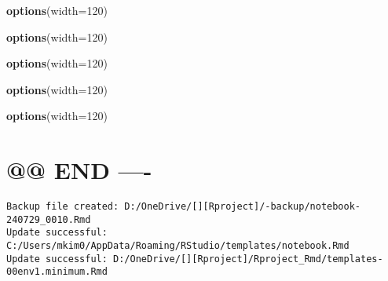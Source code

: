 \documentclass[
]{article}
\newenvironment{Shaded}{\begin{snugshade}}{\end{snugshade}}
\newcommand{\AttributeTok}[1]{\textcolor[rgb]{0.13,0.29,0.53}{#1}}
\newcommand{\DecValTok}[1]{\textcolor[rgb]{0.00,0.00,0.81}{#1}}
\newcommand{\FunctionTok}[1]{\textcolor[rgb]{0.13,0.29,0.53}{\textbf{#1}}}
\newcommand{\NormalTok}[1]{#1}
\begin{document}
\begin{Shaded}
\begin{Highlighting}[]
\FunctionTok{options}\NormalTok{(}\AttributeTok{width=}\DecValTok{120}\NormalTok{)}
\end{Highlighting}
\end{Shaded}

\begin{Shaded}
\begin{Highlighting}[]
\FunctionTok{options}\NormalTok{(}\AttributeTok{width=}\DecValTok{120}\NormalTok{)}
\end{Highlighting}
\end{Shaded}

\begin{Shaded}
\begin{Highlighting}[]
\FunctionTok{options}\NormalTok{(}\AttributeTok{width=}\DecValTok{120}\NormalTok{)}
\end{Highlighting}
\end{Shaded}

\begin{Shaded}
\begin{Highlighting}[]
\FunctionTok{options}\NormalTok{(}\AttributeTok{width=}\DecValTok{120}\NormalTok{)}
\end{Highlighting}
\end{Shaded}

\begin{Shaded}
\begin{Highlighting}[]
\FunctionTok{options}\NormalTok{(}\AttributeTok{width=}\DecValTok{120}\NormalTok{)}
\end{Highlighting}
\end{Shaded}

\hypertarget{end--}{%
\section{@@ END ----}\label{end--}}

\begin{verbatim}
Backup file created: D:/OneDrive/[][Rproject]/-backup/notebook-240729_0010.Rmd
Update successful: C:/Users/mkim0/AppData/Roaming/RStudio/templates/notebook.Rmd
Update successful: D:/OneDrive/[][Rproject]/Rproject_Rmd/templates-00env1.minimum.Rmd
\end{verbatim}
\end{document}
